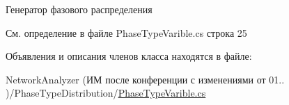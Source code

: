 Генератор фазового распределения 



См. определение в файле Phase\+Type\+Varible.\+cs строка 25



Объявления и описания членов класса находятся в файле\+:\begin{DoxyCompactItemize}
\item 
Network\+Analyzer (ИМ после конференции  с изменениями от 01.. )/\+Phase\+Type\+Distribution/\hyperlink{_phase_type_varible_8cs}{Phase\+Type\+Varible.\+cs}\end{DoxyCompactItemize}
